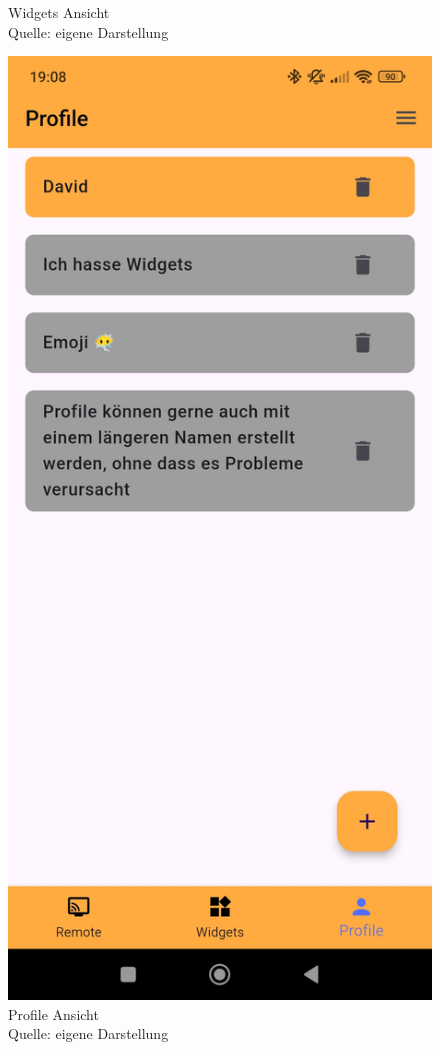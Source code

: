 \begin{figure}[h]
\begin{minipage}[b]{0.25\textwidth}
        \captionsetup{justification=centering, labelformat=simple, singlelinecheck=false}
        \caption{Widgets Ansicht\\ Quelle: eigene Darstellung}
    \end{minipage}
    \hfill
    \begin{minipage}[b]{0.25\textwidth}
        \centering
        \includegraphics[width=\textwidth]{pictures/remote_profile.jpg}
        \captionsetup{justification=centering, labelformat=simple, singlelinecheck=false}
        \caption{Profile Ansicht\\ Quelle: eigene Darstellung}
    \end{minipage}
\end{figure}

